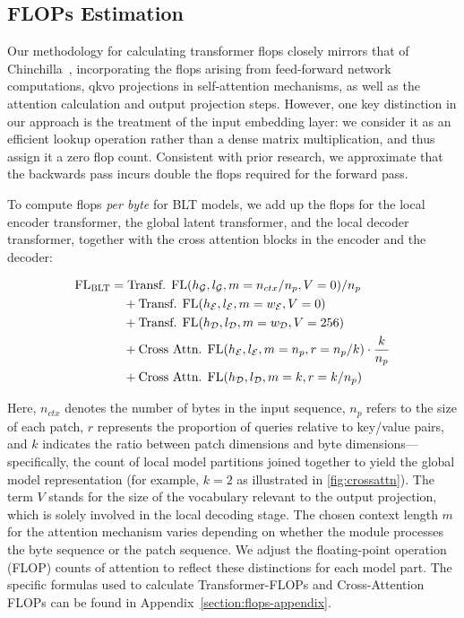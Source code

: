 \subsection{FLOPs Estimation} 
\label{section:flops}

Our methodology for calculating transformer flops closely mirrors that of Chinchilla~\citep{hoffmann2022training}, incorporating the flops arising from feed-forward network computations, qkvo projections in self-attention mechanisms, as well as the attention calculation and output projection steps. However, one key distinction in our approach is the treatment of the input embedding layer: we consider it as an efficient lookup operation rather than a dense matrix multiplication, and thus assign it a zero flop count. Consistent with prior research, we approximate that the backwards pass incurs double the flops required for the forward pass.

To compute flops \textit{per byte} for {\textsc BLT} models, we add up the flops for the local encoder transformer, the global latent transformer, and the local decoder transformer, together with the cross attention blocks in the encoder and the decoder:

\begin{align}
    \text{FL}_{\text{{\textsc BLT}}} &= \text{Transf. FL}(h_{\mathcal{G}}, l_{\mathcal{G}}, m=n_{ctx}/n_p, V=0) / n_p\\
    &\quad + \text{Transf. FL}(h_{\mathcal{E}}, l_{\mathcal{E}}, m=w_{\mathcal{E}}, V=0) \\
    &\quad + \text{Transf. FL}(h_{\mathcal{D}}, l_{\mathcal{D}}, m=w_{\mathcal{D}}, V=256) \\ 
    &\quad + \text{Cross Attn. FL}(h_{\mathcal{E}}, l_{\mathcal{E}}, m=n_p, r=n_p/k) \cdot \frac{k}{n_p} \\ 
    &\quad + \text{Cross Attn. FL}(h_{\mathcal{D}}, l_{\mathcal{D}}, m=k, r=k/n_p)
\end{align}

Here, $n_{ctx}$ denotes the number of bytes in the input sequence, $n_p$ refers to the size of each patch, $r$ represents the proportion of queries relative to key/value pairs, and $k$ indicates the ratio between patch dimensions and byte dimensions—specifically, the count of local model partitions joined together to yield the global model representation (for example, $k=2$ as illustrated in \autoref{fig:crossattn}). The term $V$ stands for the size of the vocabulary relevant to the output projection, which is solely involved in the local decoding stage. The chosen context length $m$ for the attention mechanism varies depending on whether the module processes the byte sequence or the patch sequence. We adjust the floating-point operation (FLOP) counts of attention to reflect these distinctions for each model part. The specific formulas used to calculate Transformer-FLOPs and Cross-Attention FLOPs can be found in Appendix~\ref{section:flops-appendix}.


